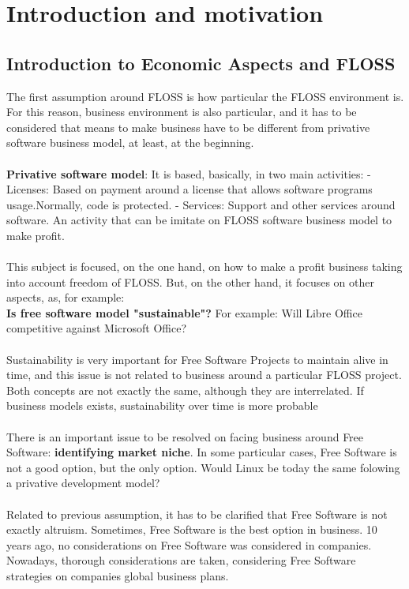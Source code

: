 \chapter{Introduction and motivation}

\section{Introduction to Economic Aspects and FLOSS}\label{ECO_FLOSS} 
The first assumption around FLOSS is how particular the FLOSS environment is. For this reason, business environment is also particular, and it has to be considered that means to make business have to be different from privative software business model, at least, at the beginning.\\
\\
\textbf{Privative software model}: It is based, basically, in two main activities:
- Licenses: Based on payment around a license that allows software programs usage.Normally, code is protected.
- Services: Support and other services around software. An activity that can be imitate on FLOSS software business model to make profit.\\
\\
This subject is focused, on the one hand, on how to make a profit business taking into account freedom of FLOSS.
But, on the other hand, it focuses on other aspects, as, for example:\\ 
\textbf{Is free software model "sustainable"?} For example: Will Libre Office competitive against Microsoft Office?\\
\\
Sustainability is very important for Free Software Projects to maintain alive in time, and this issue is not related to business around a particular FLOSS project. Both concepts are not exactly the same, although they are interrelated. If business models exists, sustainability over time is more probable\\
\\
There is an important issue to be resolved on facing business around Free Software: \textbf{identifying market niche}. In some particular cases, Free Software is not a good option, but the only option. Would Linux be today the same folowing a privative development model?\\
\\
Related to previous assumption, it has to be clarified that Free Software is not exactly altruism. Sometimes, Free Software is the best option in business. 10 years ago, no considerations on Free Software was considered in companies. Nowadays, thorough considerations are taken, considering Free Software strategies on companies global business plans.\\

